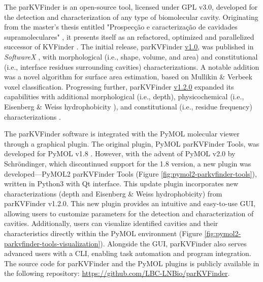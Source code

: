 \documentclass[Ingles]{phdthesis}
\def\ie{i.e.\onedot}
\begin{document}
The \ac{parKVFinder} \cite{guerra2020} is an open-source tool, licensed under GPL v3.0, developed for the detection and characterization of any type of biomolecular cavity. Originating from the master's thesis entitled "Prospecção e caracterização de cavidades supramoleculares" \cite{guerra2019}, it presents itself as an refactored, optimized and parallelized successor of KVFinder \cite{oliveira2014}. The initial release, parKVFinder \href{https://github.com/LBC-LNBio/parKVFinder/releases/tag/v1.0}{v1.0}, was published in \textit{SoftwareX} \cite{guerra2020}, with morphological (\ie, shape, volume, and area) and constitutional (\ie, interface residues surrounding cavities) characterizations. A notable addition was a novel algorithm for surface area estimation, based on Mullikin & Verbeek voxel classification. Progressing further, parKVFinder \href{https://github.com/LBC-LNBio/parKVFinder/releases/tag/v1.2.0}{v1.2.0} expanded its capabilities with additional morphological (\ie, depth), physicochemical (\ie, Eisenberg & Weiss hydrophobicity \cite{eisenberg1984}), and constitutional (\ie, residue frequency) characterizations \cite{guerra2023A}. 

The parKVFinder software is integrated with the PyMOL molecular viewer \cite{pymol} through a graphical plugin. The original plugin, PyMOL parKVFinder Tools, was developed for PyMOL v1.8 \cite{guerra2019,guerra2020}. However, with the advent of PyMOL v2.0 by Schröndinger, which discontinued support for the 1.8 version, a new plugin was developed---PyMOL2 parKVFinder Tools (Figure \ref{fig:pymol2-parkvfinder-tools}), written in Python3 with Qt interface. This update plugin incorporates new characterizations (depth and Eisenberg & Weiss hydrophobicity) from parKVFinder v1.2.0. This new plugin provides an intuitive and easy-to-use \ac{GUI}, allowing users to customize parameters for the detection and characterization of cavities.  Additionally, users can visualize identified cavities and their characteristics directly within the PyMOL environment (Figure \ref{fig:pymol2-parkvfinder-tools-visualization}). Alongside the \acs{GUI}, parKVFinder also serves advanced users with a \ac{CLI}, enabling task automation and program integration. The source code for parKVFinder and the PyMOL plugins is publicly available in the following repository: \url{https://github.com/LBC-LNBio/parKVFinder}.
\end{document}
